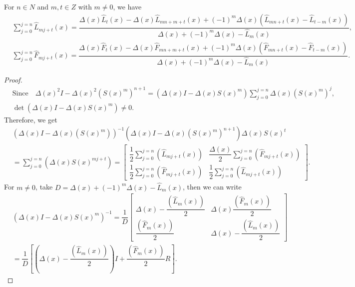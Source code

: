 \begin{theorem}
For $n\in N$ and $m, t\in Z$ with $m\neq 0$, we have
\begin{align*}
&\sum_{j=0}^{j=n}\widehat{L}_{mj+t}(x)=\dfrac{\Delta (x)\widehat{L}_{t}(x)-\Delta(x)\widehat{L}_{mn+m+t}(x)+(-1)^m\Delta(x)(\widehat{L}_{mn+t}(x)-\widehat{L}_{t-m}(x))}{\Delta(x)+(-1)^m\Delta(x)-\widehat{L}_{m}(x)},\\
&\sum_{j=0}^{j=n}\widehat{F}_{mj+t}(x)=\dfrac{\Delta(x) \widehat{F}_{t}(x)-\Delta(x) \widehat{F}_{mn+m+t}(x)+(-1)^m\Delta(x) (\widehat{F}_{mn+t}(x)-\widehat{F}_{t-m}(x))}{\Delta(x)+(-1)^m\Delta(x)-\widehat{L}_{m}(x)}.
\end{align*}
\end{theorem}
\begin{proof}
\begin{align*}
&\text{Since}\quad
\Delta(x)^2 I-\Delta(x)^2(S(x)^m)^{n+1}=(\Delta(x) I-\Delta(x) S(x)^m)\sum_{j=0}^{j=n}\Delta(x) (S(x)^m)^j,\\
&\det(\Delta(x) I-\Delta(x) S(x)^m)\neq 0. 
\end{align*}
Therefore, we get
\begin{align*}
&\left( \Delta(x) I-\Delta(x)(S(x)^m)\right) ^{-1}(\Delta(x) I-\Delta(x)(S(x)^m)^{n+1})\Delta(x) S(x)^t\\&=\sum_{j=0}^{j=n}(\Delta(x) S(x)^{mj+t})={\left[
 \begin{array}{cc}
    \dfrac{1}{2}{\displaystyle\sum_{j=0}^{j=n}(\widehat{L}_{mj+t}(x))} & \dfrac{\Delta(x)}{2}{\displaystyle\sum_{j=0}^{j=n}(\widehat{F}_{mj+t}(x))}\\
    \dfrac{1}{2}{\displaystyle\sum_{j=0}^{j=n}(\widehat{F}_{mj+t}(x))} & \dfrac{1}{2}{\displaystyle\sum_{j=0}^{j=n}(\widehat{L}_{mj+t}(x))}
	\end{array}
	\right]}.
\end{align*}
For $m\neq 0$, take $ D=\Delta(x)+(-1)^m \Delta(x)-\widehat{L}_{m}(x)$, then we can write
\begin{align*}
&(\Delta(x) I-\Delta(x) S(x)^m)^{-1}=\dfrac{1}{D}{\left[
 \begin{array}{cc}
   \Delta(x) -\dfrac{(\widehat{L}_{m}(x))}{2} & \Delta(x)\dfrac{(\widehat{F}_{m}(x))}{2}\\
    \dfrac{(\widehat{F}_{m}(x))}{2} & \Delta(x) -\dfrac{(\widehat{L}_{m}(x))}{2}
	\end{array}
	\right]}\\
	&=\dfrac{1}{D}\left[(\Delta(x) -\dfrac{(\widehat{L}_{m}(x))}{2})I+\dfrac{(\widehat{F}_{m}(x))}{2}R\right].
\end{align*}

\end{proof}
